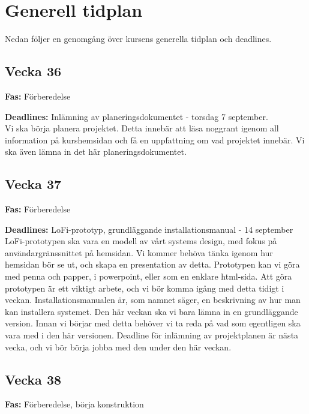 \documentclass{TDP003mall}
\begin{document}
\section{Generell tidplan}
Nedan följer en genomgång över kursens generella tidplan och deadlines.

\subsection*{Vecka 36}

\textbf{Fas:} Förberedelse

\textbf{Deadlines:} Inlämning av planeringsdokumentet - torsdag 7 september.\\

Vi ska börja planera projektet. Detta innebär att läsa noggrant igenom all information på kurshemsidan och få en uppfattning om vad projektet innebär. Vi ska även lämna in det här planeringsdokumentet.\\

\subsection*{Vecka 37}

\textbf{Fas:} Förberedelse

\textbf{Deadlines:} LoFi-prototyp, grundläggande installationsmanual - 14 september\\

LoFi-prototypen ska vara en modell av vårt systems design, med fokus på användargränssnittet på hemsidan. Vi kommer behöva tänka igenom hur hemsidan bör se ut, och skapa en presentation av detta. Prototypen kan vi göra med penna och papper, i powerpoint, eller som en enklare html-sida. Att göra prototypen är ett viktigt arbete, och vi bör komma igång med detta tidigt i veckan.
Installationsmanualen är, som namnet säger, en beskrivning av hur man kan installera systemet. Den här veckan ska vi bara lämna in en grundläggande version. Innan vi börjar med detta behöver vi ta reda på vad som egentligen ska vara med i den här versionen.
Deadline för inlämning av projektplanen är nästa vecka, och vi bör börja jobba med den under den här veckan.\\


\subsection*{Vecka 38}

\textbf{Fas:} Förberedelse, börja konstruktion
\end{document}
